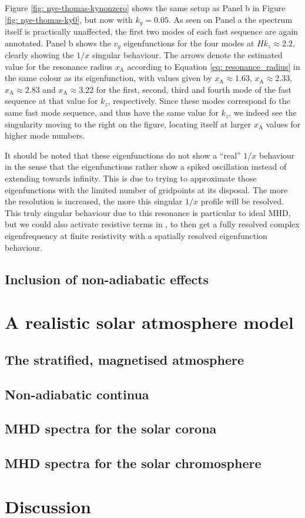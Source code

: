 Figure \ref{fig: nye-thomas-kynonzero} shows the same setup as Panel b in Figure \ref{fig: nye-thomas-ky0}, but now with $k_y = 0.05$. As seen on Panel a the spectrum itself is practically unaffected, the first two modes of each fast sequence are again annotated. Panel b shows the $v_y$ eigenfunctions for the four modes at $H k_z \approx 2.2$, clearly showing the $1/x$ singular behaviour. The arrows denote the estimated value for the resonance radius $x_\text{A}$ according to Equation \eqref{eq: resonance_radius} in the same colour as its eigenfunction, with values given by $x_\text{A} \approx 1.63$, $x_\text{A} \approx 2.33$, $x_\text{A} \approx 2.83$ and $x_\text{A} \approx 3.22$ for the first, second, third and fourth mode of the fast sequence at that value for $k_z$, respectively. Since these modes correspond fo the same fast mode sequence, and thus have the same value for $k_z$, we indeed see the singularity moving to the right on the figure, locating itself at larger $x_\text{A}$ values for higher mode numbers.

It should be noted that these eigenfunctions do not show a ``real'' $1/x$ behaviour in the sense that the eigenfunctions rather show a spiked oscillation instead of extending towards infinity. This is due to {\legolas} trying to approximate those eigenfunctions with the limited number of gridpoints at its disposal. The more the resolution is increased, the more this singular $1/x$ profile will be resolved. This truly singular behaviour due to this resonance is particular to ideal MHD, but we could also activate resistive terms in {\legolas}, to then get a fully resolved complex eigenfrequency at finite resistivity with a spatially resolved eigenfunction behaviour.


\subsection{Inclusion of non-adiabatic effects} \label{ss: non_adiabatic_effects}

\section{A realistic solar atmosphere model} \label{sec: solar_atmosphere}
\subsection{The stratified, magnetised atmosphere} \label{ss: atmosphere_model}
\subsection{Non-adiabatic continua} \label{ss: non_adiabatic_continua}
\subsection{MHD spectra for the solar corona} \label{ss: corona_spectra}
\subsection{MHD spectra for the solar chromosphere} \label{ss: chromosphere_spectra}

\section{Discussion}



\cleardoublepage
